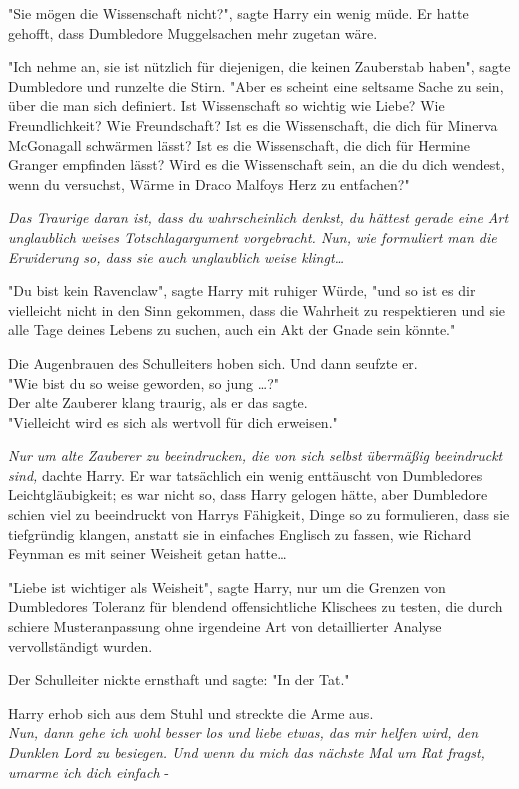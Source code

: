 {"Sie mögen die Wissenschaft nicht?", sagte Harry ein wenig müde. Er hatte gehofft, dass Dumbledore Muggelsachen mehr zugetan wäre.

"Ich nehme an, sie ist nützlich für diejenigen, die keinen Zauberstab haben", sagte Dumbledore und runzelte die Stirn. "Aber es scheint eine seltsame Sache zu sein, über die man sich definiert. Ist Wissenschaft so wichtig wie Liebe? Wie Freundlichkeit? Wie Freundschaft? Ist es die Wissenschaft, die dich für Minerva McGonagall schwärmen lässt? Ist es die Wissenschaft, die dich für Hermine Granger empfinden lässt? Wird es die Wissenschaft sein, an die du dich wendest, wenn du versuchst, Wärme in Draco Malfoys Herz zu entfachen?"

\emph{Das Traurige daran ist, dass du wahrscheinlich denkst, du hättest gerade eine Art unglaublich weises Totschlagargument vorgebracht. Nun, wie formuliert man die Erwiderung so, dass sie auch unglaublich weise klingt…}

"Du bist kein Ravenclaw", sagte Harry mit ruhiger Würde, "und so ist es dir vielleicht nicht in den Sinn gekommen, dass die Wahrheit zu respektieren und sie alle Tage deines Lebens zu suchen, auch ein Akt der Gnade sein könnte."

Die Augenbrauen des Schulleiters hoben sich. Und dann seufzte er.\\ "Wie bist du so weise geworden, so jung …?"\\ Der alte Zauberer klang traurig, als er das sagte.\\ "Vielleicht wird es sich als wertvoll für dich erweisen."

\emph{Nur um alte Zauberer zu beeindrucken, die von sich selbst übermäßig beeindruckt sind,} dachte Harry. Er war tatsächlich ein wenig enttäuscht von Dumbledores Leichtgläubigkeit; es war nicht so, dass Harry gelogen hätte, aber Dumbledore schien viel zu beeindruckt von Harrys Fähigkeit, Dinge so zu formulieren, dass sie tiefgründig klangen, anstatt sie in einfaches Englisch zu fassen, wie Richard Feynman es mit seiner Weisheit getan hatte…

"Liebe ist wichtiger als Weisheit", sagte Harry, nur um die Grenzen von Dumbledores Toleranz für blendend offensichtliche Klischees zu testen, die durch schiere Musteranpassung ohne irgendeine Art von detaillierter Analyse vervollständigt wurden.

Der Schulleiter nickte ernsthaft und sagte: "In der Tat."

Harry erhob sich aus dem Stuhl und streckte die Arme aus.\\ \emph{Nun, dann gehe ich wohl besser los und liebe etwas, das mir helfen wird, den Dunklen Lord zu besiegen. Und wenn du mich das nächste Mal um Rat fragst, umarme ich dich einfach} -

}
